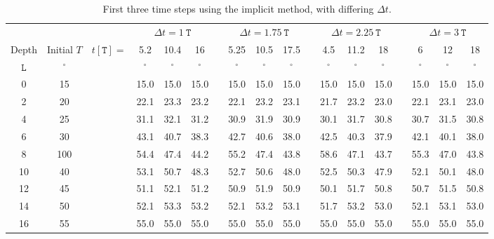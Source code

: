 \begin{table}[h]
    \centering
    \caption{First three time steps using the implicit method, with differing $\Delta t$.}
    \label{tab:implicit}
    \scriptsize
    \begin{tabular}{@{}*{18}c@{}}
        \toprule
        & && \multicolumn{3}{c}{$\Delta t = \SI{1}{\mathtt{T}}$} && \multicolumn{3}{c}{$\Delta t = \SI{1.75}{\mathtt{T}}$} && \multicolumn{3}{c}{$\Delta t = \SI{2.25}{\mathtt{T}}$} && \multicolumn{3}{c}{$\Delta t = \SI{3}{\mathtt{T}}$} \\
        \cmidrule{4-6} \cmidrule{8-10} \cmidrule{12-14} \cmidrule{16-18}
        Depth & Initial $T$ & $t[\mathtt{T}]=$ & 5.2 & 10.4 & 16 && 5.25 & 10.5 & 17.5 && 4.5 & 11.2 & 18 && 6 & 12 & 18 \\
        $\mathtt{L}$ & $^\circ$ && $^\circ$ & $^\circ$ & $^\circ$ && $^\circ$ & $^\circ$ & $^\circ$ && $^\circ$ & $^\circ$ & $^\circ$ && $^\circ$ & $^\circ$ & $^\circ$ \\ 
        \midrule
        0  & 15  && 15.0 & 15.0 & 15.0 && 15.0 & 15.0 & 15.0 && 15.0 & 15.0 & 15.0 && 15.0 & 15.0 & 15.0 \\
        2  & 20  && 22.1 & 23.3 & 23.2 && 22.1 & 23.2 & 23.1 && 21.7 & 23.2 & 23.0 && 22.1 & 23.1 & 23.0 \\
        4  & 25  && 31.1 & 32.1 & 31.2 && 30.9 & 31.9 & 30.9 && 30.1 & 31.7 & 30.8 && 30.7 & 31.5 & 30.8 \\
        6  & 30  && 43.1 & 40.7 & 38.3 && 42.7 & 40.6 & 38.0 && 42.5 & 40.3 & 37.9 && 42.1 & 40.1 & 38.0 \\
        8  & 100 && 54.4 & 47.4 & 44.2 && 55.2 & 47.4 & 43.8 && 58.6 & 47.1 & 43.7 && 55.3 & 47.0 & 43.8 \\
        10 & 40  && 53.1 & 50.7 & 48.3 && 52.7 & 50.6 & 48.0 && 52.5 & 50.3 & 47.9 && 52.1 & 50.1 & 48.0 \\
        12 & 45  && 51.1 & 52.1 & 51.2 && 50.9 & 51.9 & 50.9 && 50.1 & 51.7 & 50.8 && 50.7 & 51.5 & 50.8 \\
        14 & 50  && 52.1 & 53.3 & 53.2 && 52.1 & 53.2 & 53.1 && 51.7 & 53.2 & 53.0 && 52.1 & 53.1 & 53.0 \\
        16 & 55  && 55.0 & 55.0 & 55.0 && 55.0 & 55.0 & 55.0 && 55.0 & 55.0 & 55.0 && 55.0 & 55.0 & 55.0 \\
        \bottomrule
    \end{tabular}
\end{table}
